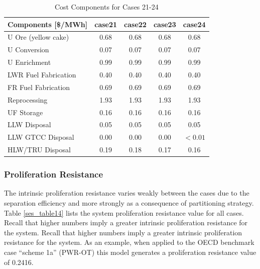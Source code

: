 \begin{table}[htbp]
\begin{center}
\caption{Cost Components for Cases 21-24}
\label{ses_table13_2}
\begin{tabular}{|l|c|c|c|c|}
\hline
\textbf{Components [\$/MWh]} & \textbf{case21} & \textbf{case22} & \textbf{case23} & \textbf{case24} \\
\hline
U Ore (yellow cake)          & 0.68            & 0.68            & 0.68            & 0.68 \\
U Conversion                 & 0.07            & 0.07            & 0.07            & 0.07 \\
U Enrichment                 & 0.99            & 0.99            & 0.99            & 0.99 \\
LWR Fuel Fabrication         & 0.40            & 0.40            & 0.40            & 0.40 \\
FR Fuel Fabrication          & 0.69            & 0.69            & 0.69            & 0.69 \\
Reprocessing                 & 1.93            & 1.93            & 1.93            & 1.93 \\
UF Storage                   & 0.16            & 0.16            & 0.16            & 0.16 \\
LLW Disposal                 & 0.05            & 0.05            & 0.05            & 0.05 \\
LLW GTCC Disposal            & 0.00            & 0.00            & 0.00            & $<0.01$ \\
HLW/TRU Disposal             & 0.19            & 0.18            & 0.17            & 0.16 \\
\hline
\end{tabular}
\end{center}
\end{table}



\subsubsection{Proliferation Resistance}
\label{ses_sec:prilif_res}
The intrinsic proliferation resistance varies weakly between the cases
due to the separation efficiency and more strongly as a consequence of
partitioning strategy.  Table \ref{ses_table14} lists the system proliferation
resistance value for all cases.  Recall that higher numbers imply a
greater intrinsic proliferation resistance for the system.  Recall that
higher numbers imply a greater intrinsic proliferation resistance for
the system.  As an example, when applied to the OECD benchmark case
``scheme 1a'' (PWR-OT) this model generates a proliferation resistance
value of 0.2416.

